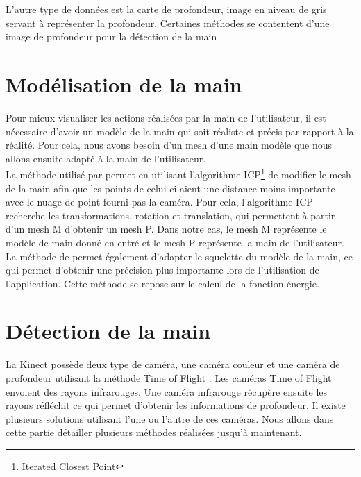 L'autre type de données est la carte de profondeur, image en niveau de gris servant à représenter la profondeur. Certaines méthodes se contentent d'une image de profondeur pour la détection de la main \cite{export:238453}

\section{Modélisation de la main}
Pour mieux visualiser les actions réalisées par la main de l'utilisateur, il est nécessaire d'avoir
un modèle de la main qui soit réaliste et précis par rapport à la réalité. Pour cela, nous avons besoin d'un
mesh d'une main modèle que nous allons ensuite adapté à la main de l'utilisateur.\\

La méthode utilisé par \cite{export:217428} permet en utilisant l'algorithme
ICP\footnote{Iterated Closest Point} \cite{121791} de modifier le mesh de la main afin
que les points de celui-ci aient une distance moins importante avec le nuage de point fourni pas la 
caméra. Pour cela, l'algorithme ICP recherche les transformations, rotation et translation, qui permettent 
à partir d'un mesh M d'obtenir un mesh P. Dans notre cas, le mesh M représente le modèle de main donné en entré
et le mesh P représente la main de l'utilisateur.\\ 

La méthode de \cite{export:217428} permet également d'adapter le squelette du modèle de la 
main, ce qui permet d'obtenir une précision plus importante lors de l'utilisation de l'application.
Cette méthode se repose sur le calcul de la fonction énergie.

\section{Détection de la main}

La Kinect possède deux type de caméra, une caméra couleur et une caméra de profondeur utilisant la méthode 
\og Time of Flight \fg. Les caméras \og Time of Flight \fg envoient des rayons infrarouges. Une caméra infrarouge
récupère ensuite les rayons réfléchit ce qui permet d'obtenir les informations de profondeur. 
Il existe plusieurs solutions utilisant l'une ou l'autre de ces caméras. Nous allons
dans cette partie détailler plusieurs méthodes réalisées jusqu'à maintenant.

